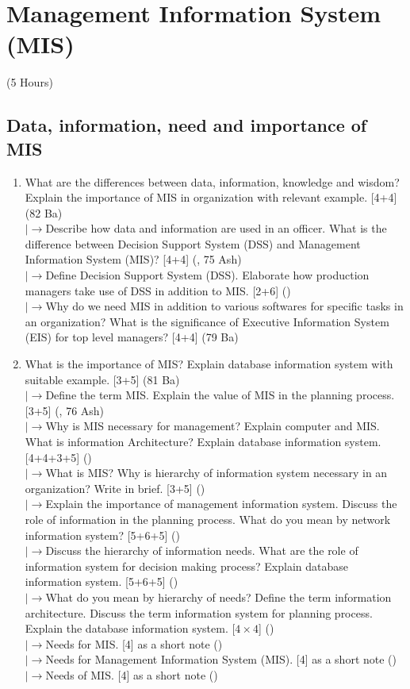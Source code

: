 \documentclass[12pt]{article}
\newcommand{\lb}{\\$\left|\rightarrow\right.$}
\begin{document}
\pagebreak
\section{Management Information System (MIS)}
\begin{center}(5 Hours)\end{center}

  \subsection{Data, information, need and importance of MIS}
    \begin{enumerate}[topsep=0pt, noitemsep]
      \item What are the differences between data, information, knowledge and wisdom? Explain the importance of MIS in organization with relevant example. \hfill [4+4] (82 Ba)
        \lb Describe how data and information are used in an officer. What is the difference between Decision Support System (DSS) and Management Information System (MIS)? \hfill [4+4] (, 75 Ash)
        \lb Define Decision Support System (DSS). Elaborate how production managers take use of DSS in addition to MIS. \hfill [2+6] ()
        \lb Why do we need MIS in addition to various softwares for specific tasks in an organization? What is the significance of Executive Information System (EIS) for top level managers? \hfill [4+4] (79 Ba)

      \item What is the importance of MIS? Explain database information system with suitable example. \hfill [3+5] (81 Ba)
        \lb Define the term MIS. Explain the value of MIS in the planning process. \hfill [3+5] (, 76 Ash)
        \lb Why is MIS necessary for management? Explain computer and MIS. What is information Architecture? Explain database information system. \hfill [4+4+3+5] ()
        \lb What is MIS? Why is hierarchy of information system necessary in an organization? Write in brief. \hfill [3+5] ()
        \lb Explain the importance of management information system. Discuss the role of information in the planning process. What do you mean by network information system? \hfill [5+6+5] ()
        \lb Discuss the hierarchy of information needs. What are the role of information system for decision making process? Explain database information system. \hfill [5+6+5] ()
        \lb What do you mean by hierarchy of needs? Define the term information architecture. Discuss the term information system for planning process. Explain the database information system. \hfill [$4\times4$] ()
        \lb Needs for MIS. \hfill [4] as a short note ()
        \lb Needs for Management Information System (MIS). \hfill [4] as a short note ()
        \lb Needs of MIS. \hfill [4] as a short note ()
    \end{enumerate}
\end{document}
